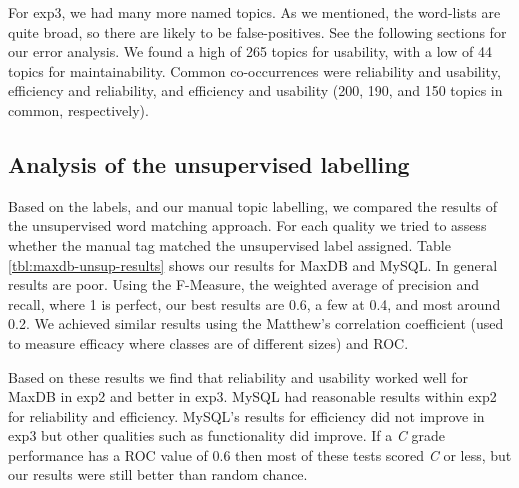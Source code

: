 \documentclass{acm_proc_article-sp}
\begin{document}
For \textsf{exp3}, we had many more named topics. As we mentioned, the word-lists are quite broad, so there are likely to be false-positives. See the following sections for our error analysis. We found a high of 265 topics for usability, with a low of 44 topics for maintainability. Common co-occurrences were reliability and usability, efficiency and reliability, and efficiency and usability (200, 190, and 150 topics in common, respectively). 

\subsection{Analysis of the unsupervised labelling}

\label{sec:unsuplabelling}

Based on the labels, and our manual topic labelling, we compared the results of the unsupervised word matching approach. For each quality we tried to assess whether the manual tag matched the unsupervised label assigned. Table \ref{tbl:maxdb-unsup-results} shows our results for MaxDB and MySQL. In general results are poor. Using the F-Measure, the weighted average of precision and recall, where 1 is perfect, our best results are 0.6, a few at 0.4, and most around 0.2. We achieved similar results using the Matthew's correlation coefficient (used to measure efficacy where classes are of different sizes) and ROC.  

Based on these results we find that reliability and usability worked well for MaxDB in \textsf{exp2} and better in \textsf{exp3}. MySQL had reasonable results within \textsf{exp2} for reliability and efficiency. MySQL's results for efficiency did not improve in \textsf{exp3} but other qualities such as functionality did improve. If a \emph{C} grade performance has a ROC value of $0.6$ then most of these tests scored \emph{C} or less, but our results were still better than random chance.
\end{document}
